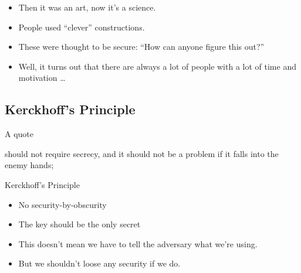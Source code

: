 \begin{frame}
  \begin{itemize}
    \item Then it was an art, now it's a science.

      \pause{}

    \item People used \enquote{clever} constructions.
    \item These were thought to be secure: \enquote{How can anyone figure this 
        out?}

      \pause{}

    \item Well, it turns out that there are always a lot of people with a lot 
      of time and motivation \dots
  \end{itemize}
\end{frame}

\subsection{Kerckhoff's Principle}

\begin{frame}
  \begin{block}{A quote}
    \begin{displayquote}\relax
      [A cryptosystem] should not require secrecy, and it should not be 
      a problem
      if it falls into the enemy hands;
    \end{displayquote}
  \end{block}

  \pause{}

  \begin{block}{Kerckhoff's Principle}
    \begin{itemize}
      \item No security-by-obscurity
      \item The key should be the only secret
    \end{itemize}
  \end{block}
\end{frame}

\begin{frame}
  \begin{itemize}
    \item This doesn't mean we have to tell the adversary what we're using.
    \item But we shouldn't loose any security if we do.
  \end{itemize}
\end{frame}


